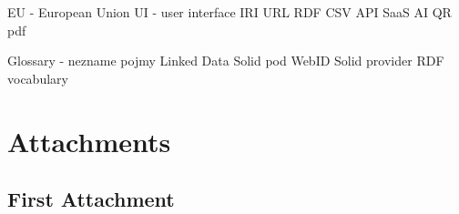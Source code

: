 \documentclass[12pt,a4paper]{report}
\let\openright=\clearpage
\begin{document}



\tableofcontents


\listoftodos










% 
% 


\listoffigures
\listoftables
EU - European Union
UI - user interface
IRI
URL
RDF
CSV
API
SaaS
AI
QR
pdf

Glossary - nezname pojmy
Linked Data
Solid pod
WebID
Solid provider
RDF vocabulary

\appendix
\chapter{Attachments}

\section{First Attachment}

\openright
\end{document}
